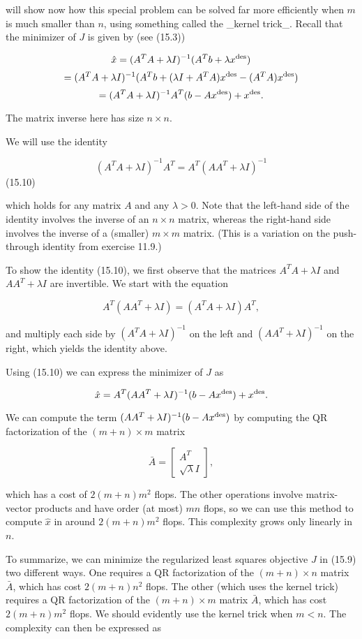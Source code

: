 will show now how this special problem can be solved far more efficiently when \(m\) is much smaller than \(n\), using something called the _kernel trick_. Recall that the minimizer of \(J\) is given by (see (15.3))

\[\hat{x} = (A^{T}A+\lambda I)^{-1}(A^{T}b+\lambda x^{\rm des})\] \[= (A^{T}A+\lambda I)^{-1}(A^{T}b+(\lambda I+A^{T}A)x^{\rm des}-(A^{T }A)x^{\rm des})\] \[= (A^{T}A+\lambda I)^{-1}A^{T}(b-Ax^{\rm des})+x^{\rm des}.\]

The matrix inverse here has size \(n\times n\).

We will use the identity

\[(A^{T}A+\lambda I)^{-1}A^{T}=A^{T}(AA^{T}+\lambda I)^{-1}\] (15.10)

which holds for any matrix \(A\) and any \(\lambda>0\). Note that the left-hand side of the identity involves the inverse of an \(n\times n\) matrix, whereas the right-hand side involves the inverse of a (smaller) \(m\times m\) matrix. (This is a variation on the push-through identity from exercise 11.9.)

To show the identity (15.10), we first observe that the matrices \(A^{T}A+\lambda I\) and \(AA^{T}+\lambda I\) are invertible. We start with the equation

\[A^{T}(AA^{T}+\lambda I)=(A^{T}A+\lambda I)A^{T},\]

and multiply each side by \((A^{T}A+\lambda I)^{-1}\) on the left and \((AA^{T}+\lambda I)^{-1}\) on the right, which yields the identity above.

Using (15.10) we can express the minimizer of \(J\) as

\[\hat{x}=A^{T}(AA^{T}+\lambda I)^{-1}(b-Ax^{\rm des})+x^{\rm des}.\]

We can compute the term \((AA^{T}+\lambda I)^{-1}(b-Ax^{\rm des})\) by computing the QR factorization of the \((m+n)\times m\) matrix

\[\bar{A}=\left[\begin{array}{c}A^{T}\\ \sqrt{\lambda}I\end{array}\right],\]

which has a cost of \(2(m+n)m^{2}\) flops. The other operations involve matrix-vector products and have order (at most) \(mn\) flops, so we can use this method to compute \(\hat{x}\) in around \(2(m+n)m^{2}\) flops. This complexity grows only linearly in \(n\).

To summarize, we can minimize the regularized least squares objective \(J\) in (15.9) two different ways. One requires a QR factorization of the \((m+n)\times n\) matrix \(\bar{A}\), which has cost \(2(m+n)n^{2}\) flops. The other (which uses the kernel trick) requires a QR factorization of the \((m+n)\times m\) matrix \(\bar{A}\), which has cost \(2(m+n)m^{2}\) flops. We should evidently use the kernel trick when \(m<n\). The complexity can then be expressed as

